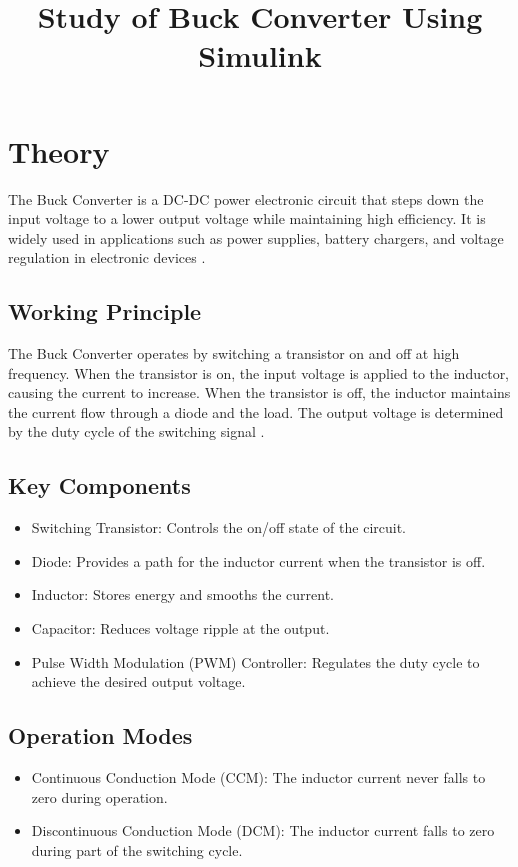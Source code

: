 \documentclass[12pt]{article}
\title{Study of Buck Converter Using Simulink}
\author{}
\date{}
\begin{document}


\pagebreak

\tableofcontents

\pagebreak
{}
\maketitle

\section*{Theory}
The Buck Converter is a DC-DC power electronic circuit that steps down the input voltage to a lower output voltage while maintaining high efficiency. It is widely used in applications such as power supplies, battery chargers, and voltage regulation in electronic devices \cite{rashid2013power}.

\subsection*{Working Principle}
The Buck Converter operates by switching a transistor on and off at high frequency. When the transistor is on, the input voltage is applied to the inductor, causing the current to increase. When the transistor is off, the inductor maintains the current flow through a diode and the load. The output voltage is determined by the duty cycle of the switching signal \cite{sen1987principles}.

\subsection*{Key Components}
\begin{itemize}
    \item Switching Transistor: Controls the on/off state of the circuit.
    \item Diode: Provides a path for the inductor current when the transistor is off.
    \item Inductor: Stores energy and smooths the current.
    \item Capacitor: Reduces voltage ripple at the output.
    \item Pulse Width Modulation (PWM) Controller: Regulates the duty cycle to achieve the desired output voltage.
\end{itemize}

\subsection*{Operation Modes}
\begin{itemize}
    \item Continuous Conduction Mode (CCM): The inductor current never falls to zero during operation.
    \item Discontinuous Conduction Mode (DCM): The inductor current falls to zero during part of the switching cycle.
\end{itemize}
\end{document}
